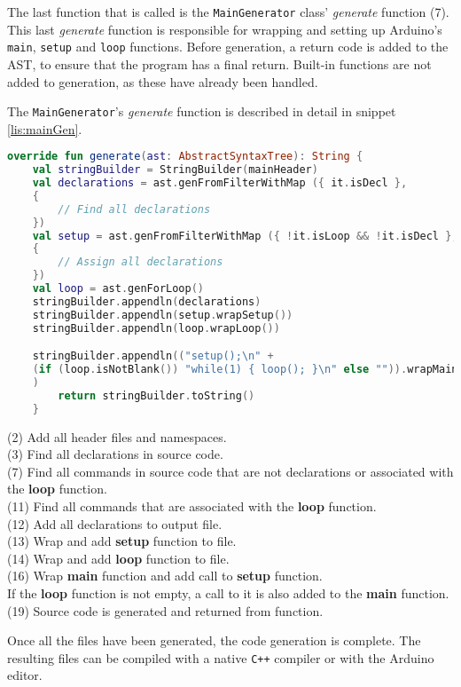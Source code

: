The last function that is called is the \texttt{MainGenerator} class' \textit{generate} function (7). 
This last \textit{generate} function is responsible for wrapping and setting up Arduino's \texttt{main}, \texttt{setup} and \texttt{loop} functions.
Before generation, a return code is added to the AST, to ensure that the program has a final return.
Built-in functions are not added to generation, as these have already been handled. 

The \texttt{MainGenerator}'s \textit{generate} function is described in detail in snippet \ref{lis:mainGen}.
\begin{lstlisting}[language=Kotlin,label=lis:mainGen,caption=The implementation of \textit{generate} in \texttt{MainGenerator}.]
override fun generate(ast: AbstractSyntaxTree): String {
	val stringBuilder = StringBuilder(mainHeader)
	val declarations = ast.genFromFilterWithMap ({ it.isDecl }, 
	{
		// Find all declarations	
	})
	val setup = ast.genFromFilterWithMap ({ !it.isLoop && !it.isDecl }, 
	{
	    // Assign all declarations
	})
	val loop = ast.genForLoop()
	stringBuilder.appendln(declarations)
	stringBuilder.appendln(setup.wrapSetup())
	stringBuilder.appendln(loop.wrapLoop())

	stringBuilder.appendln(("setup();\n" +
	(if (loop.isNotBlank()) "while(1) { loop(); }\n" else "")).wrapMain()
	)
		return stringBuilder.toString()
	}
\end{lstlisting}
(2) Add all header files and namespaces.\\ 
(3) Find all declarations in source code.\\
(7) Find all commands in source code that are not declarations or associated with the \textbf{loop} function.\\
(11) Find all commands that are associated with the \textbf{loop} function.\\
(12) Add all declarations to output file.\\
(13) Wrap and add \textbf{setup} function to file.\\
(14) Wrap and add \textbf{loop} function to file.\\
(16) Wrap \textbf{main} function and add call to \textbf{setup} function.\\
If the \textbf{loop} function is not empty, a call to it is also added to the \textbf{main} function.\\
(19) Source code is generated and returned from function. 

Once all the files have been generated, the code generation is complete.
The resulting files can be compiled with a native \texttt{C++} compiler or with the Arduino editor.